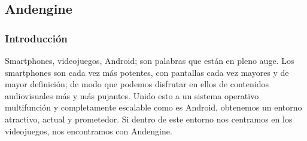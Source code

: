 \documentclass[12 pt, a4paper, twoside]{article}
\begin{document}









\newpage
\subsection{Andengine}
\subsubsection{Introducción}
Smartphones, videojuegos, Android; son palabras que están en pleno
auge. Los smartphones son cada vez más potentes, con pantallas cada
vez mayores y de mayor definición; de modo que podemos disfrutar en
ellos de contenidos audiovisuales más y más pujantes. Unido esto a
un sistema operativo multifunción y completamente escalable como es
Android, obtenemos un entorno atractivo, actual y prometedor. Si
dentro de este entorno nos centramos en los videojuegos, nos
encontramos con Andengine.
\end{document}
